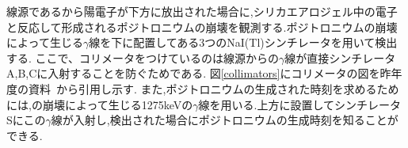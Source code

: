 線源であるから陽電子が下方に放出された場合に,シリカエアロジェル中の電子と反応して形成されるポジトロニウムの崩壊を観測する.ポジトロニウムの崩壊によって生じる$\gamma$線を下に配置してある3つのNaI(Tl)シンチレータを用いて検出する.
ここで、コリメータをつけているのは線源からの$\gamma$線が直接シンチレータA,B,Cに入射することを防ぐためである.
図\ref{collimators}にコリメータの図を昨年度の資料~\cite{卒業発表2015}から引用し示す.
また,ポジトロニウムの生成された時刻を求めるためには,の崩壊によって生じる1275keVの$\gamma$線を用いる.上方に設置してシンチレータSにこの$\gamma$線が入射し,検出された場合にポジトロニウムの生成時刻を知ることができる.

